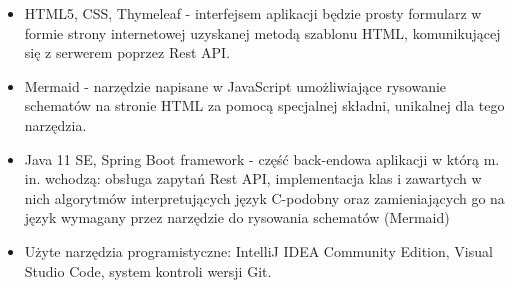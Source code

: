 \begin{itemize}
	\item HTML5, CSS, Thymeleaf - interfejsem aplikacji będzie prosty formularz w formie strony internetowej uzyskanej metodą szablonu HTML, komunikującej się z serwerem poprzez Rest API.	
	
	\item Mermaid - narzędzie napisane w JavaScript umożliwiające rysowanie schematów na stronie HTML	za pomocą specjalnej składni, unikalnej dla tego narzędzia.
	
	\item Java 11 SE, Spring Boot framework - część back-endowa aplikacji w którą m. in. wchodzą: obsługa zapytań Rest API, implementacja klas i zawartych w nich algorytmów interpretujących język C-podobny oraz zamieniających go na język wymagany przez narzędzie do rysowania schematów (Mermaid)
	
	\item Użyte narzędzia programistyczne: IntelliJ IDEA Community Edition, Visual Studio Code, system kontroli wersji Git.
		
		
\end{itemize}
	